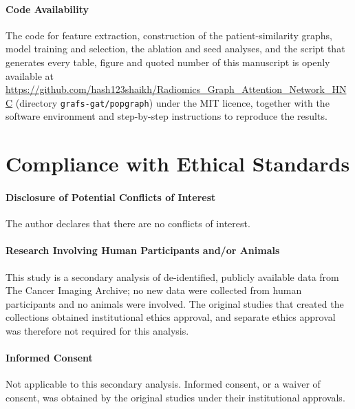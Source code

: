 \documentclass[11pt,a4paper]{article}
\begin{document}
\paragraph{Code Availability}
The code for feature extraction, construction of the patient-similarity graphs, model training and selection, the ablation and seed analyses, and the script that generates every table, figure and quoted number of this manuscript is openly available at \url{https://github.com/hash123shaikh/Radiomics_Graph_Attention_Network_HNC} (directory \texttt{grafs-gat/popgraph}) under the MIT licence, together with the software environment and step-by-step instructions to reproduce the results.

\section*{Compliance with Ethical Standards}

\paragraph{Disclosure of Potential Conflicts of Interest}
The author declares that there are no conflicts of interest.

\paragraph{Research Involving Human Participants and/or Animals}
This study is a secondary analysis of de-identified, publicly available data from The Cancer Imaging Archive; no new data were collected from human participants and no animals were involved. The original studies that created the collections obtained institutional ethics approval, and separate ethics approval was therefore not required for this analysis.

\paragraph{Informed Consent}
Not applicable to this secondary analysis. Informed consent, or a waiver of consent, was obtained by the original studies under their institutional approvals.
\end{document}
